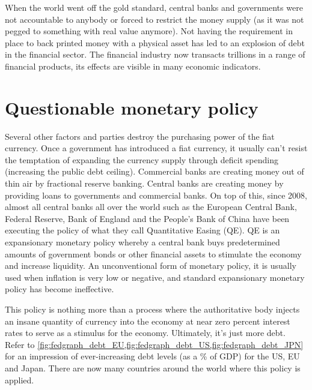 \medskip

\noindent When the world went off the gold standard, central banks and governments were not accountable to anybody or forced to restrict the money supply (as it was not pegged to something with real value anymore). Not having the requirement in place to back printed money with a physical asset has led to an explosion of debt in the financial sector. The financial industry now transacts trillions in a range of financial products, its effects are visible in many economic indicators.\medskip

\section{Questionable monetary policy}
Several other factors and parties destroy the purchasing power of the fiat currency. Once a government has introduced a fiat currency, it usually can't resist the temptation of expanding the currency supply through deficit spending (increasing the public debt ceiling). Commercial banks are creating money out of thin air by fractional reserve banking. Central banks are creating money by providing loans to governments and commercial banks. On top of this, since 2008, almost all central banks all over the world such as the European Central Bank, Federal Reserve, Bank of England and the People's Bank of China have been executing the policy of what they call Quantitative Easing (QE). QE is an expansionary monetary policy whereby a central bank buys predetermined amounts of government bonds or other financial assets to stimulate the economy and increase liquidity. An unconventional form of monetary policy, it is usually used when inflation is very low or negative, and standard expansionary monetary policy has become ineffective.

This policy is nothing more than a process where the authoritative body injects an insane quantity of currency into the economy at near zero percent interest rates to serve as a stimulus for the economy. Ultimately, it's just more debt. Refer to \cref{fig:fedgraph_debt_EU,fig:fedgraph_debt_US,fig:fedgraph_debt_JPN} for an impression of ever-increasing debt levels (as a \% of GDP) for the US, EU and Japan. There are now many countries around the world where this policy is applied.




